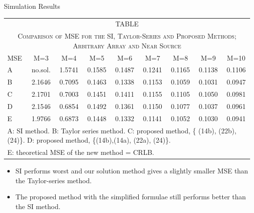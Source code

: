 \documentclass[10pt]{beamer}
\begin{document}
\begin{frame}{Simulation Results}
  \begin{center}
  \begin{tabular}{l c c c c c c c c}\\
  \multicolumn{9}{c}{TABLE \uppercase\expandafter{\romannumeral1}}\\
  \multicolumn{9}{c}{\textsc{\tiny Comparison of MSE for the SI, Taylor-Series and Proposed Methods; Arbitrary Array and Near Source}}\\\hline
  \scriptsize MSE  &  \scriptsize  M=3     &  \scriptsize  M=4    &  \scriptsize M=5    &  \scriptsize  M=6    &  \scriptsize  M=7    &  \scriptsize M=8    &  \scriptsize M=9     &  \scriptsize M=10     \\\hline
  \scriptsize A    &  \scriptsize no.sol.  &  \scriptsize  1.5741 &  \scriptsize 0.1585 &  \scriptsize  0.1487 &  \scriptsize  0.1241 &  \scriptsize 0.1165 &  \scriptsize 0.1138  &  \scriptsize 0.1106   \\
  \scriptsize B    &  \scriptsize 2.1646   &  \scriptsize  0.7095 &  \scriptsize 0.1463 &  \scriptsize  0.1338 &  \scriptsize  0.1153 &  \scriptsize 0.1059 &  \scriptsize 0.1031  &  \scriptsize 0.0947   \\
  \scriptsize C    &  \scriptsize 2.1701   &  \scriptsize  0.7003 &  \scriptsize 0.1451 &  \scriptsize  0.1411 &  \scriptsize  0.1155 &  \scriptsize 0.1105 &  \scriptsize 0.1050  &  \scriptsize 0.0981   \\
  \scriptsize D    &  \scriptsize 2.1546   &  \scriptsize  0.6854 &  \scriptsize 0.1492 &  \scriptsize  0.1361 &  \scriptsize  0.1150 &  \scriptsize 0.1077 &  \scriptsize 0.1037  &  \scriptsize 0.0961   \\
  \scriptsize E    &  \scriptsize 1.9766   &  \scriptsize  0.6873 &  \scriptsize 0.1448 &  \scriptsize  0.1332 &  \scriptsize  0.1141 &  \scriptsize 0.1052 &  \scriptsize 0.1030  &  \scriptsize 0.0941   \\\hline
  \multicolumn{9}{l}{\tiny A: SI method. B: Taylor series method. C: proposed method, \{ (14b), (22b), (24)\}. D: proposed method, \{(14b),(14a), (22a), (24)\}. }\\
  \multicolumn{9}{l}{\tiny E: theoretical MSE of the new method = CRLB.}
  \end{tabular}
  \end{center}
  \begin{itemize}
		\item \small SI performs worst and our solution method gives a slightly smaller MSE than the Taylor-series method.
		\item \small The proposed method with the simplified formulae still performs better than the SI method.
	\end{itemize}
\end{frame}
\end{document}
